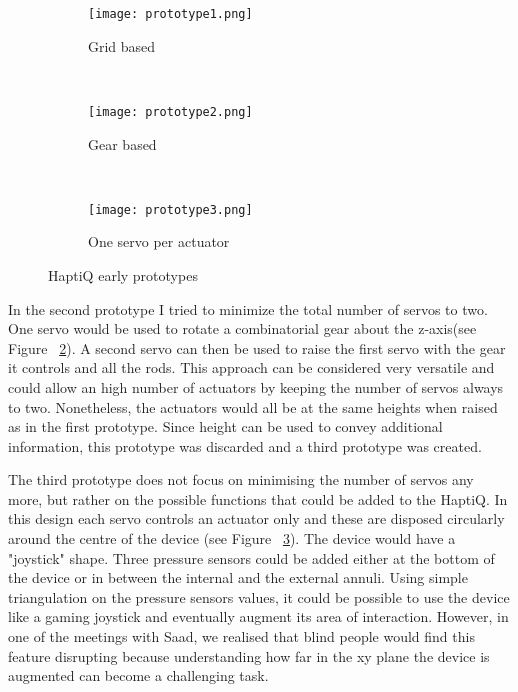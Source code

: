 \begin{figure}
        \centering
        \begin{subfigure}[H]{0.5\textwidth}
                \texttt{[image: prototype1.png]}
                \caption{Grid based}
                \label{fig:first prototype}
        \end{subfigure}%
        ~ %
        \begin{subfigure}[H]{0.5\textwidth}
                \texttt{[image: prototype2.png]}
                \caption{Gear based}
                \label{fig:second prototype}
        \end{subfigure}
        ~ %
        \begin{subfigure}[H]{0.5\textwidth}
                \texttt{[image: prototype3.png]}
                \caption{One servo per actuator}
                \label{fig:third prototype}
        \end{subfigure}
        \caption{HaptiQ early prototypes}\label{fig:HaptiQ-early-prototypes}
\end{figure}

In the second prototype I tried to minimize the total number of servos to two. One servo would be used to rotate a combinatorial gear about the z-axis(see Figure ~\ref{fig:second prototype}). A second servo can then be used to raise the first servo with the gear it controls and all the rods. This approach can be considered very versatile and could allow an high number of actuators by keeping the number of servos always to two. Nonetheless, the actuators would all be at the same heights when raised as in the first prototype. Since height can be used to convey additional information, this prototype was discarded and a third prototype was created.

The third prototype does not focus on minimising the number of servos any more, but rather on the possible functions that could be added to the HaptiQ. In this design each servo controls an actuator only and these are disposed circularly around the centre of the device (see Figure ~\ref{fig:third prototype}). The device would have a "joystick" shape. Three pressure sensors could be added either at the bottom of the device or in between the internal and the external annuli. Using simple triangulation on the pressure sensors values, it could be possible to use the device like a gaming joystick and eventually augment its area of interaction. However, in one of the meetings with Saad, we realised that blind people would find this feature disrupting because understanding how far in the xy plane the device is augmented can become a challenging task. 

